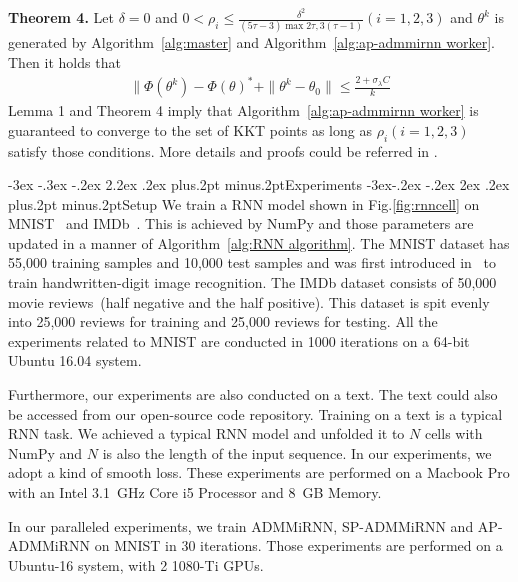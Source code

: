 \documentclass[twoside]{article}
\makeatletter
\def\section{\@startsection{section}{1}{\z@}%
 {-3ex \@plus -.3ex \@minus -.2ex}%
 {2.2ex \@plus.2ex}%
{\normalfont\normalsize\protect\baselineskip=14.5pt plus.2pt minus.2pt\bfseries}}
\def\subsection{\@startsection{subsection}{2}{\z@}%
 {-3ex\@plus -.2ex \@minus -.2ex}%
 {2ex \@plus.2ex}%
{\normalfont\normalsize\protect\baselineskip=12.5pt plus.2pt minus.2pt\bfseries}}
\makeatother
\begin{document}
\begin{multicols}{2}
{\bf Theorem 4.} Let $\delta = 0$ and $0 < \rho_i \le \frac{\delta^2}{(5\tau -3)\max{2\tau, 3(\tau -1)}} (i=1,2,3)$ and $\theta^k$ is generated by Algorithm~\ref{alg:master} and Algorithm~\ref{alg:ap-admmirnn worker}. Then it holds that 
\begin{equation}
    \begin{aligned}
        \|\Phi(\theta^k) - \Phi(\theta)^{*} + \|\theta^k-\theta_0\| \le \frac{2+\sigma_{\lambda}C}{k}
    \end{aligned}
\end{equation}
Lemma 1 and Theorem 4 imply that Algorithm~\ref{alg:ap-admmirnn worker} is guaranteed to converge to the set of KKT points as long as $\rho_i (i=1,2,3)$ satisfy those conditions.
More details and proofs could be referred in \cite{chang2016asynchronous}.   

\section{Experiments}\label{sec:experiments}
\subsection{Setup}
We train a RNN model shown in Fig.\ref{fig:rnncell} on MNIST~\cite{lecun1998gradient} and IMDb~\cite{dodds2006popular}. 
This is achieved by NumPy and those parameters are updated in a manner of Algorithm~\ref{alg:RNN algorithm}.
The MNIST dataset has 55,000 training samples and 10,000 test samples and was first introduced in~\cite{lecun1998gradient} to train handwritten-digit image recognition. The IMDb dataset consists of 50,000 movie reviews~(half negative and the half positive). This dataset is spit evenly into 25,000 reviews for training and 25,000 reviews for testing. 
All the experiments related to MNIST are conducted in 1000 iterations on a 64-bit Ubuntu 16.04 system.

Furthermore, our experiments are also conducted on a text.
The text could also be accessed from our open-source code repository.
Training on a text is a typical RNN task.
We achieved a typical RNN model and unfolded it to $N$ cells with NumPy and $N$ is also the length of the input sequence. 
In our experiments, we adopt a kind of smooth loss.
These experiments are performed on a Macbook Pro with an Intel 3.1~GHz Core i5 Processor and 8~GB Memory. 

In our paralleled experiments, we train ADMMiRNN, SP-ADMMiRNN and AP-ADMMiRNN on MNIST in 30 iterations. Those experiments are performed on a Ubuntu-16 system, with 2 1080-Ti GPUs. 


\end{multicols}
\end{document}

